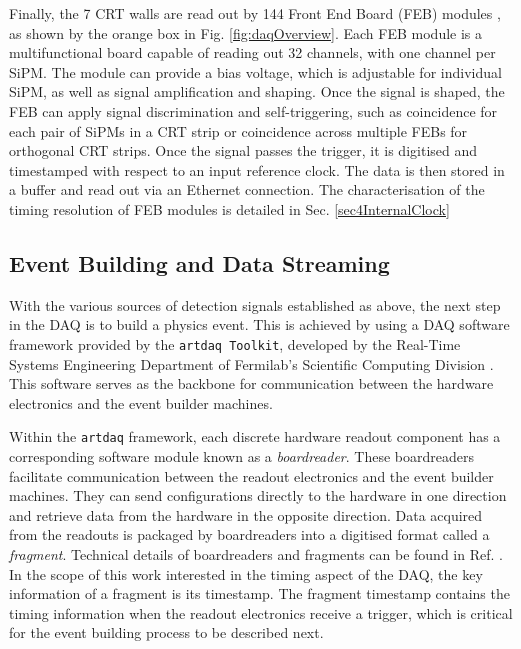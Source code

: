 Finally, the 7 CRT walls are read out by 144 Front End Board (FEB) modules \cite{crt_note}, as shown by the orange box in Fig. \ref{fig:daqOverview}.
Each FEB module is a multifunctional board capable of reading out 32 channels, with one channel per SiPM. 
The module can provide a bias voltage, which is adjustable for individual SiPM, as well as signal amplification and shaping.
Once the signal is shaped, the FEB can apply signal discrimination and self-triggering, such as coincidence for each pair of SiPMs in a CRT strip or coincidence across multiple FEBs for orthogonal CRT strips. 
Once the signal passes the trigger, it is digitised and timestamped with respect to an input reference clock. 
The data is then stored in a buffer and read out via an Ethernet connection. 
The characterisation of the timing resolution of FEB modules is detailed in Sec. \ref{sec4InternalClock}

\subsection{Event Building and Data Streaming}
\label{sec:evb}

With the various sources of detection signals established as above, the next step in the DAQ is to build a physics event.
This is achieved by using a DAQ software framework provided by the \texttt{artdaq Toolkit}, developed by the Real-Time Systems Engineering Department of Fermilab's Scientific Computing Division \cite{artdaq_note}. 
This software serves as the backbone for communication between the hardware electronics and the event builder machines.

Within the \texttt{artdaq} framework, each discrete hardware readout component has a corresponding software module known as a \textit{boardreader}.
These boardreaders facilitate communication between the readout electronics and the event builder machines. 
They can send configurations directly to the hardware in one direction and retrieve data from the hardware in the opposite direction.
Data acquired from the readouts is packaged by boardreaders into a digitised format called a \textit{fragment}.
Technical details of boardreaders and fragments can be found in Ref. \cite{artdaq_note}.
In the scope of this work interested in the timing aspect of the DAQ, the key information of a fragment is its timestamp.
The fragment timestamp contains the timing information when the readout electronics receive a trigger, which is critical for the event building process to be described next.

